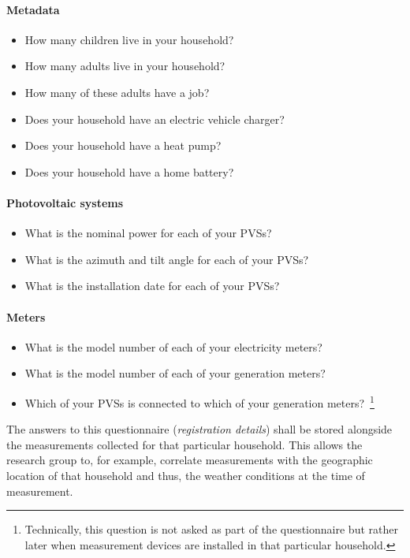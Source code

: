 \paragraph{Metadata}
\begin{itemize}
  \item How many children live in your household?
  \item How many adults live in your household?
  \item How many of these adults have a job?
  \item Does your household have an electric vehicle charger?
  \item Does your household have a heat pump?
  \item Does your household have a home battery?
\end{itemize}

\newpage

\paragraph{Photovoltaic systems}
\begin{itemize}
  \item What is the nominal power for each of your \acp{PVS}?
  \item What is the azimuth and tilt angle for each of your \acp{PVS}?
  \item What is the installation date for each of your \acp{PVS}?
\end{itemize}

\paragraph{Meters}
\begin{itemize}
  \item What is the model number of each of your electricity meters?
  \item What is the model number of each of your generation meters?
  \item Which of your \acsp{PVS} is connected to which of your generation meters?~\footnote{Technically, this question is not asked as part of the questionnaire but rather later when measurement devices are installed in that particular household.}
\end{itemize}

The answers to this questionnaire (\textit{registration details}) shall be stored alongside the measurements  collected for that particular household. This allows the research group to, for example, correlate measurements with the geographic location of that household and thus, the weather conditions at the time of measurement.



